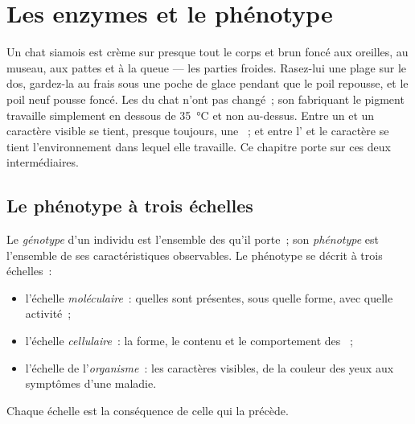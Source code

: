 \chapter{Les enzymes et le phénotype}\label{ch:g11:enzymes-and-phenotype}

Un chat siamois est crème sur presque tout le corps et brun foncé aux
oreilles, au museau, aux pattes et à la queue --- les parties froides.
Rasez-lui une plage sur le dos, gardez-la au frais sous une poche de
glace pendant que le poil repousse, et le poil neuf pousse foncé. Les
 du chat n'ont pas changé~; son  fabriquant le pigment
travaille simplement en dessous de \qty{35}{\celsius} et non au-dessus.
Entre un  et un caractère visible se tient, presque toujours, une
~; et entre l' et le caractère se tient l'environnement
dans lequel elle travaille. Ce chapitre porte sur ces deux
intermédiaires.

\section{Le phénotype à trois échelles}

\begin{definition}\label{def:g11:enzymes-and-phenotype:phenotype}
Le \emph{génotype} d'un individu est l'ensemble des
 qu'il porte~; son \emph{phénotype} est
l'ensemble de ses caractéristiques observables. Le phénotype se décrit
à trois échelles~:
\begin{itemize}
  \item l'échelle \emph{moléculaire}~: quelles  sont
        présentes, sous quelle forme, avec quelle activité~;
  \item l'échelle \emph{cellulaire}~: la forme, le contenu et le
        comportement des ~;
  \item l'échelle de l'\emph{organisme}~: les caractères visibles, de
        la couleur des yeux aux symptômes d'une maladie.
\end{itemize}
Chaque échelle est la conséquence de celle qui la précède.
\end{definition}

